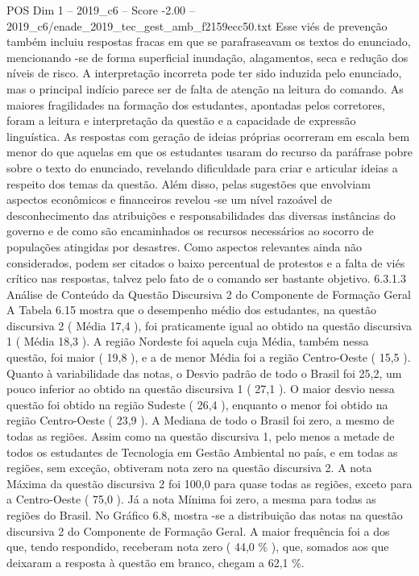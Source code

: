 \begin{textsample}{POS Dim 1 – 2019\_c6 – Score -2.00 – 2019\_c6/enade\_2019\_tec\_gest\_amb\_f2159ecc50.txt}
Esse viés de prevenção também incluiu respostas fracas em que se parafraseavam os textos do enunciado, mencionando -se de forma superficial inundação, alagamentos, seca e redução dos níveis de risco.
A interpretação incorreta pode ter sido induzida pelo enunciado, mas o principal indício parece ser de falta de atenção na leitura do comando.
As maiores fragilidades na formação dos estudantes, apontadas pelos corretores, foram a leitura e interpretação da questão e a capacidade de expressão linguística.
As respostas com geração de ideias próprias ocorreram em escala bem menor do que aquelas em que os estudantes usaram do recurso da paráfrase pobre sobre o texto do enunciado, revelando dificuldade para criar e articular ideias a respeito dos temas da questão.
Além disso, pelas sugestões que envolviam aspectos econômicos e financeiros revelou -se um nível razoável de desconhecimento das atribuições e responsabilidades das diversas instâncias do governo e de como são encaminhados os recursos necessários ao socorro de populações atingidas por desastres.
Como aspectos relevantes ainda não considerados, podem ser citados o baixo percentual de protestos e a falta de viés crítico nas respostas, talvez pelo fato de o comando ser bastante objetivo. 6.3.1.3 Análise de Conteúdo da Questão Discursiva 2 do Componente de Formação Geral A Tabela 6.15 mostra que o desempenho médio dos estudantes, na questão discursiva 2 ( Média 17,4 ), foi praticamente igual ao obtido na questão discursiva 1 ( Média 18,3 ).
A região Nordeste foi aquela cuja Média, também nessa questão, foi maior ( 19,8 ), e a de menor Média foi a região Centro-Oeste ( 15,5 ).
Quanto à variabilidade das notas, o Desvio padrão de todo o Brasil foi 25,2, um pouco inferior ao obtido na questão discursiva 1 ( 27,1 ).
O maior desvio nessa questão foi obtido na região Sudeste ( 26,4 ), enquanto o menor foi obtido na região Centro-Oeste ( 23,9 ).
A Mediana de todo o Brasil foi zero, a mesmo de todas as regiões.
Assim como na questão discursiva 1, pelo menos a metade de todos os estudantes de Tecnologia em Gestão Ambiental no país, e em todas as regiões, sem exceção, obtiveram nota zero na questão discursiva 2.
A nota Máxima da questão discursiva 2 foi 100,0 para quase todas as regiões, exceto para a Centro-Oeste ( 75,0 ).
Já a nota Mínima foi zero, a mesma para todas as regiões do Brasil.
No Gráfico 6.8, mostra -se a distribuição das notas na questão discursiva 2 do Componente de Formação Geral.
A maior frequência foi a dos que, tendo respondido, receberam nota zero ( 44,0 \% ), que, somados aos que deixaram a resposta à questão em branco, chegam a 62,1 \%.

\end{textsample}
